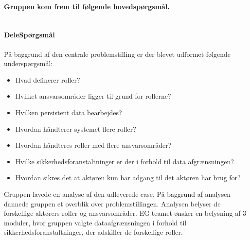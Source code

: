 \textbf{\\Gruppen kom frem til følgende hovedspørgsmål.}\\ \\
\noindent{}
 \textbf{\\DeleSpørgsmål\\}\\
På baggrund af den centrale problemstilling er der blevet udformet følgende underspørgsmål:\\ 
\begin{itemize}
\item Hvad definerer roller?
\item Hvilket ansvarsområder ligger til grund for rollerne?
\item Hvilken persistent data bearbejdes?
\item Hvordan håndterer systemet flere roller?
\item Hvordan håndteres roller med flere ansvarsområder?
\item Hvilke sikkerhedsforanstaltninger er der i forhold til data afgrænsningen?
\item Hvordan sikres det at aktøren kun har adgang til det aktøren har brug for? 
\end{itemize}
Gruppen lavede en analyse af den udleverede case. På baggrund af analysen dannede gruppen et overblik over problemstillingen. Analysen belyser de forskellige aktørers roller og ansvarsområder. EG-teamet ønsker en belysning af 3 moduler, hvor gruppen valgte dataafgrænsningen i forhold til sikkerhedsforanstaltninger, der adskiller de forskellige roller.






